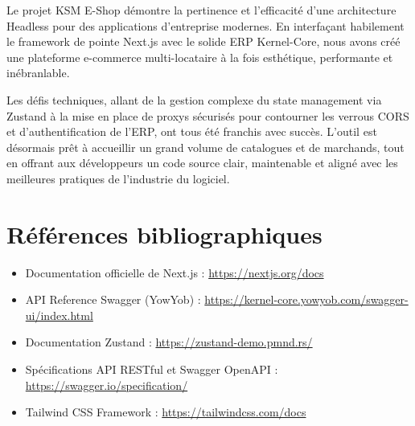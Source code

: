 \documentclass[12pt, a4paper]{report}
\begin{document}
Le projet KSM E-Shop démontre la pertinence et l'efficacité d'une architecture Headless pour des applications d'entreprise modernes. En interfaçant habilement le framework de pointe Next.js avec le solide ERP Kernel-Core, nous avons créé une plateforme e-commerce multi-locataire à la fois esthétique, performante et inébranlable.

Les défis techniques, allant de la gestion complexe du state management via Zustand à la mise en place de proxys sécurisés pour contourner les verrous CORS et d'authentification de l'ERP, ont tous été franchis avec succès. L'outil est désormais prêt à accueillir un grand volume de catalogues et de marchands, tout en offrant aux développeurs un code source clair, maintenable et aligné avec les meilleures pratiques de l'industrie du logiciel.
\chapter*{Références bibliographiques}
\begin{itemize}
    \item Documentation officielle de Next.js : \url{https://nextjs.org/docs}
    \item API Reference Swagger (YowYob) : \url{https://kernel-core.yowyob.com/swagger-ui/index.html}
    \item Documentation Zustand : \url{https://zustand-demo.pmnd.rs/}
    \item Spécifications API RESTful et Swagger OpenAPI : \url{https://swagger.io/specification/}
    \item Tailwind CSS Framework : \url{https://tailwindcss.com/docs}
\end{itemize}
\end{document}
